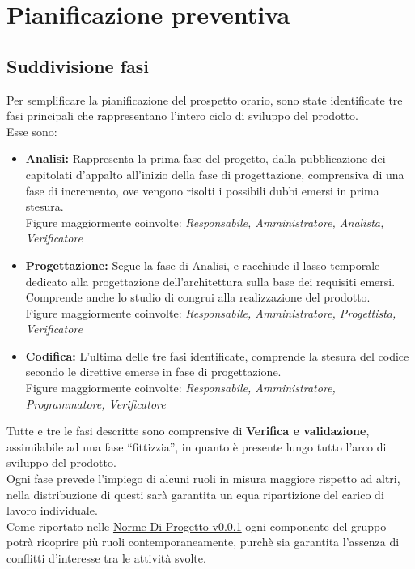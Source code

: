 \documentclass{scalatekids-article}
\begin{document}
\section{Pianificazione preventiva}
\subsection{Suddivisione fasi}
\label{sub:fasi}
Per semplificare la pianificazione del prospetto orario, sono state identificate
tre fasi principali che rappresentano l'intero ciclo di sviluppo del prodotto.\\
Esse sono:
\begin{itemize}
\item\textbf{Analisi:} Rappresenta la prima fase del progetto, dalla
  pubblicazione dei capitolati d'appalto all'inizio della fase di progettazione,
  comprensiva di una fase di incremento, ove vengono risolti i possibili dubbi
  emersi in prima stesura.\\
  Figure maggiormente coinvolte: \textit{Responsabile, Amministratore, Analista, Verificatore}
\item\textbf{Progettazione:} Segue la fase di Analisi, e racchiude il lasso
  temporale dedicato alla progettazione dell'architettura sulla base dei requisiti
  emersi. Comprende anche lo studio di  congrui alla realizzazione
  del prodotto.\\
  Figure maggiormente coinvolte: \textit{Responsabile, Amministratore, Progettista, Verificatore}
\item\textbf{Codifica:} L'ultima delle tre fasi identificate, comprende la stesura
  del codice secondo le direttive emerse in fase di progettazione.\\
  Figure maggiormente coinvolte: \textit{Responsabile, Amministratore, Programmatore, Verificatore}
\end{itemize}
Tutte e tre le fasi descritte sono comprensive di \textbf{Verifica e
  validazione}, assimilabile ad una fase ``fittizzia'', in quanto è
presente lungo tutto l'arco di sviluppo del prodotto.\\
Ogni fase prevede l'impiego di alcuni ruoli in misura maggiore rispetto ad
altri, nella distribuzione di questi sarà garantita un equa ripartizione del
carico di lavoro individuale.\\
Come riportato nelle \href{run:../Interni/NormeDiProgetto\_v0.0.1.pdf}{Norme Di Progetto v0.0.1}
ogni componente del gruppo potrà ricoprire più ruoli contemporaneamente, purchè sia
garantita l'assenza di conflitti d'interesse tra le attività svolte.
\end{document}
